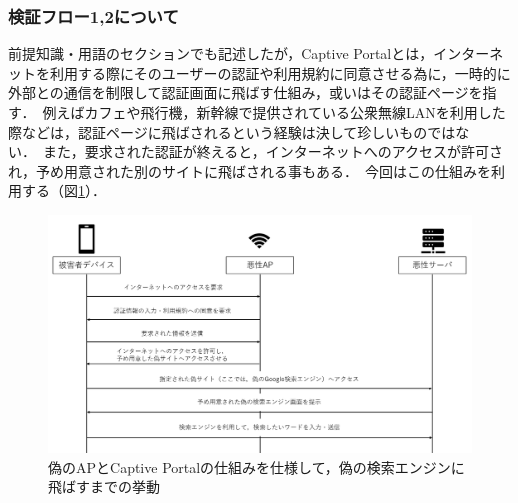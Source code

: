 \documentclass[dvipdfmx]{jsarticle}
\begin{document}
            \subsubsection{検証フロー1,2について}
                前提知識・用語のセクションでも記述したが，Captive Portalとは，インターネットを利用する際にそのユーザーの認証や利用規約に同意させる為に，一時的に外部との通信を制限して認証画面に飛ばす仕組み，或いはその認証ページを指す．\
                例えばカフェや飛行機，新幹線で提供されている公衆無線LANを利用した際などは，認証ページに飛ばされるという経験は決して珍しいものではない．\
                また，要求された認証が終えると，インターネットへのアクセスが許可され，予め用意された別のサイトに飛ばされる事もある．\
                今回はこの仕組みを利用する（図\ref{flow-no12}）．\
                \begin{figure}[pth]
                    \centering
                    \includegraphics[width=12cm]{img/vc-vf-1-2.png}
                    \caption{偽のAPとCaptive Portalの仕組みを仕様して，偽の検索エンジンに飛ばすまでの挙動}
                    \label{flow-no12}
                \end{figure}
                \clearpage
\end{document}
